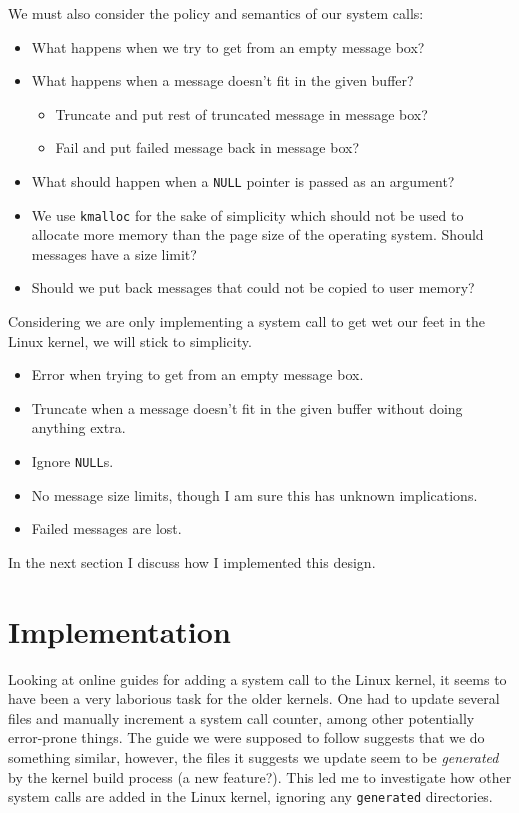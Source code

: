 \documentclass{report}
\begin{document}
We must also consider the policy and semantics of our system calls:

\begin{itemize}
	\item What happens when we try to get from an empty message box?
	\item What happens when a message doesn't fit in the given buffer?
	      \begin{itemize}
		      \item Truncate and put rest of truncated message in message box?
		      \item Fail and put failed message back in message box?
	      \end{itemize}
	\item What should happen when a \texttt{NULL} pointer is passed as an argument?
	\item We use \texttt{kmalloc} for the sake of simplicity which should not be used to allocate more memory than the page size of the operating system. Should messages have a size limit?
	\item Should we put back messages that could not be copied to user memory?
\end{itemize}

Considering we are only implementing a system call to get wet our feet in the Linux kernel, we will stick to simplicity.

\begin{itemize}
	\item Error when trying to get from an empty message box.
	\item Truncate when a message doesn't fit in the given buffer without doing anything extra.
	\item Ignore \texttt{NULL}s.
	\item No message size limits, though I am sure this has unknown implications.
	\item Failed messages are lost.
\end{itemize}

In the next section I discuss how I implemented this design.

\section*{Implementation}
\label{sec:impl}

Looking at online guides for adding a system call to the Linux kernel, it seems to have been a very laborious task for the older kernels. One had to update several files and manually increment a system call counter, among other potentially error-prone things. The guide we were supposed to follow suggests that we do something similar, however, the files it suggests we update seem to be \emph{generated} by the kernel build process (a new feature?). This led me to investigate how other system calls are added in the Linux kernel, ignoring any \texttt{generated} directories.
\end{document}
